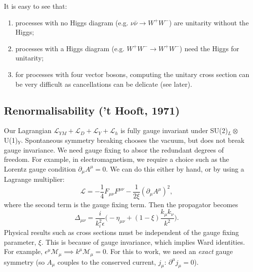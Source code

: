 \documentclass[a4paper,12pt]{article}
\begin{document}
It is easy to see that:
\begin{enumerate}
\item processes with no Higgs diagram (e.g. $\nu\bar{\nu} \to W^+ W^-$) are unitarity without the Higgs;
\item processes with a Higgs diagram (e.g. $W^+W^- \to W^+W^-$) need the Higgs for unitarity;
\item for processes with four vector bosons, computing the unitary cross section can be very difficult as cancellations can be delicate (see later).
\end{enumerate}
%
\subsection{Renormalisability ('t Hooft, 1971)}
% 
Our Lagrangian $\mathcal{L}_{YM} + \mathcal{L}_D + \mathcal{L}_Y + \mathcal{L}_h$ is fully gauge invariant under SU(2)$_L \otimes$U(1)$_Y$. Spontaneous symmetry breaking chooses the vacuum, but does not break gauge invariance. We need gauge fixing to absor the redundant degrees of freedom. For example, in electromagnetism, we require a choice such as the Lorentz gauge condition $\partial_\mu A^\mu = 0$. We can do this either by hand, or by using a Lagrange multiplier:
\begin{equation}
\mathcal{L} = - \frac{1}{4}F_{\mu \nu}F^{\mu \nu} - \frac{1}{2\xi}({\partial_\mu A^\mu})^2,
\end{equation}
where the second term is the gauge fixing term. Then the propagator becomes
\begin{equation}
\Delta_{\mu \nu} = \frac{i}{k^2 _ i\epsilon}\bigg(-\eta_{\mu \nu} + (1-\xi)\frac{k_\mu k_\nu}{k^2} \bigg).
\end{equation}
Physical results such as cross sections must be independent of the gauge fixing parameter, $\xi$. This is because of gauge invariance, which implies Ward identities. For example, $\epsilon^\mu \mathcal{M}_\mu \implies k^\mu \mathcal{M}_\mu = 0$. For this to work, we need an \textit{exact} gauge symmetry (so $A_\mu$ couples to the conserved current, $j_\mu$: $\partial^\mu j_\mu =0$).
\end{document}
